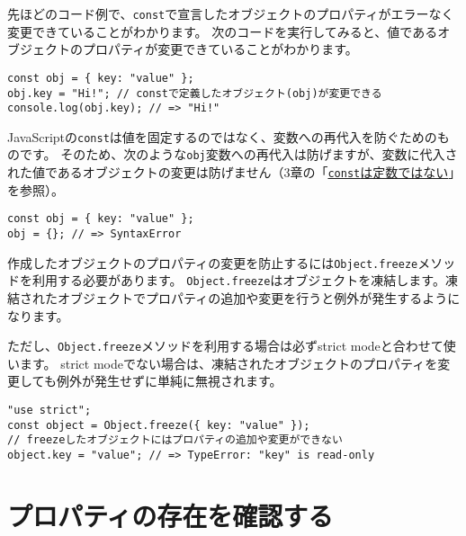 \begin{tcolorbox}[enhanced jigsaw,breakable,title=constで定義したオブジェクトは変更可能]\label{const-and-object}

先ほどのコード例で、\texttt{const}で宣言したオブジェクトのプロパティがエラーなく変更できていることがわかります。
次のコードを実行してみると、値であるオブジェクトのプロパティが変更できていることがわかります。

\begin{lstlisting}
const obj = { key: "value" };
obj.key = "Hi!"; // constで定義したオブジェクト(obj)が変更できる
console.log(obj.key); // => "Hi!"
\end{lstlisting}

JavaScriptの\texttt{const}は値を固定するのではなく、変数への再代入を防ぐためのものです。
そのため、次のような\texttt{obj}変数への再代入は防げますが、変数に代入された値であるオブジェクトの変更は防げません（3章の「\hyperlink{const-is-not-constant}{\texttt{const}は定数ではない}」を参照）。

\begin{lstlisting}
const obj = { key: "value" };
obj = {}; // => SyntaxError
\end{lstlisting}

作成したオブジェクトのプロパティの変更を防止するには\texttt{Object.freeze}メソッドを利用する必要があります。
\texttt{Object.freeze}はオブジェクトを凍結します。凍結されたオブジェクトでプロパティの追加や変更を行うと例外が発生するようになります。

ただし、\texttt{Object.freeze}メソッドを利用する場合は必ずstrict
modeと合わせて使います。 strict
modeでない場合は、凍結されたオブジェクトのプロパティを変更しても例外が発生せずに単純に無視されます。

\begin{lstlisting}
"use strict";
const object = Object.freeze({ key: "value" });
// freezeしたオブジェクトにはプロパティの追加や変更ができない
object.key = "value"; // => TypeError: "key" is read-only
\end{lstlisting}
\end{tcolorbox}

\hypertarget{confirm-property}{%
\section{プロパティの存在を確認する}\label{confirm-property}}

